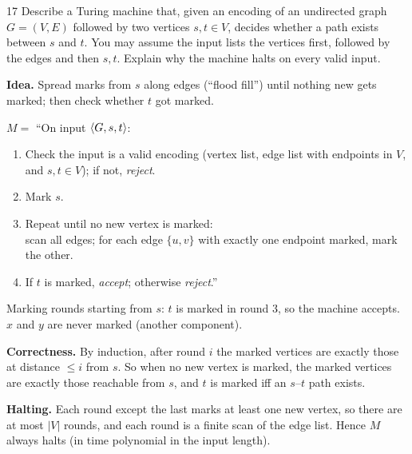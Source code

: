 \begin{question}{17}
Describe a Turing machine that, given an encoding of an undirected graph $G=(V,E)$ followed by two vertices $s,t\in V$, decides whether a path exists between $s$ and $t$. You may assume the input lists the vertices first, followed by the edges and then $s,t$. Explain why the machine halts on every valid input.
\end{question}
\begin{soln}
\textbf{Idea.} Spread marks from $s$ along edges (``flood fill'') until nothing new gets marked; then check whether $t$ got marked.

$M=$ ``On input $\langle G,s,t\rangle$:
\begin{enumerate}
\item Check the input is a valid encoding (vertex list, edge list with endpoints in $V$, and $s,t\in V$); if not, \emph{reject}.
\item Mark $s$.
\item Repeat until no new vertex is marked:\\
\hspace*{1.5em}scan all edges; for each edge $\{u,v\}$ with exactly one endpoint marked, mark the other.
\item If $t$ is marked, \emph{accept}; otherwise \emph{reject}.''
\end{enumerate}

\begin{center}

{\footnotesize Marking rounds starting from $s$: $t$ is marked in round 3, so the machine accepts. $x$ and $y$ are never marked (another component).}
\end{center}

\textbf{Correctness.} By induction, after round $i$ the marked vertices are exactly those at distance $\le i$ from $s$. So when no new vertex is marked, the marked vertices are exactly those reachable from $s$, and $t$ is marked iff an $s$--$t$ path exists.

\textbf{Halting.} Each round except the last marks at least one new vertex, so there are at most $|V|$ rounds, and each round is a finite scan of the edge list. Hence $M$ always halts (in time polynomial in the input length).
\end{soln}


